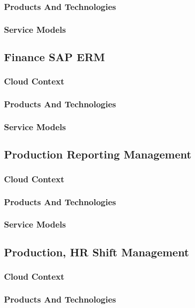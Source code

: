 \documentclass{llncs}
\begin{document}
\subsubsection{Products And Technologies}
\subsubsection{Service Models}

\subsection{Finance	SAP ERM}
\subsubsection{Cloud Context}
\subsubsection{Products And Technologies}
\subsubsection{Service Models}

\subsection{Production	Reporting Management}
\subsubsection{Cloud Context}
\subsubsection{Products And Technologies}
\subsubsection{Service Models}

\subsection{Production, HR	Shift Management}
\subsubsection{Cloud Context}
\subsubsection{Products And Technologies}
\end{document}
